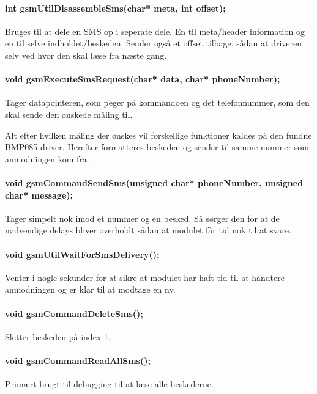 \paragraph{int gsmUtilDisassembleSms(char* meta, int offset);}
Bruges til at dele en SMS op i seperate dele. En til meta/header information og en til selve indholdet/beskeden. Sender også et offset tilbage, sådan at driveren selv ved hvor den skal læse fra næste gang.

\paragraph{void gsmExecuteSmsRequest(char* data, char* phoneNumber);}
Tager datapointeren, som peger på kommandoen og det telefonnummer, som den skal sende den ønskede måling til.

Alt efter hvilken måling der ønskes vil forskellige funktioner kaldes på den fundne BMP085 driver. Herefter formatteres beskeden og sender til samme nummer som anmodningen kom fra.

\paragraph{void gsmCommandSendSms(unsigned char* phoneNumber, unsigned char* message);}
Tager simpelt nok imod et nummer og en besked. Så sørger den for at de nødvendige delays bliver overholdt sådan at modulet får tid nok til at svare.

\paragraph{void gsmUtilWaitForSmsDelivery();}
Venter i nogle sekunder for at sikre at modulet har haft tid til at håndtere anmodningen og er klar til at modtage en ny.

\paragraph{void gsmCommandDeleteSms();}
Sletter beskeden på index 1. 

\paragraph{void gsmCommandReadAllSms();}
Primært brugt til debugging til at læse alle beskederne.



